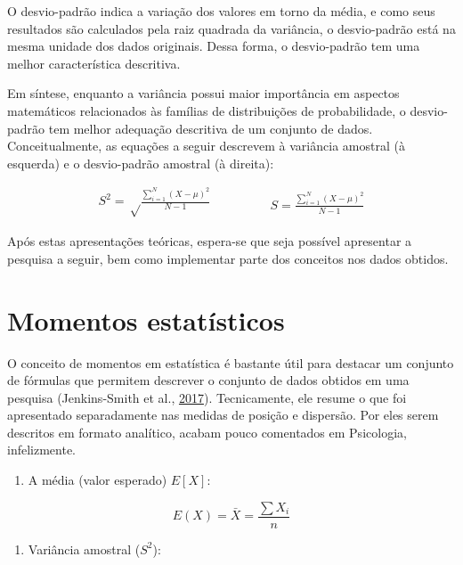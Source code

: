 \documentclass[
]{book}
\providecommand{\tightlist}{%
  \setlength{\itemsep}{0pt}\setlength{\parskip}{0pt}}
\begin{document}
O desvio-padrão indica a variação dos valores em torno da média, e como
seus resultados são calculados pela raiz quadrada da variância, o
desvio-padrão está na mesma unidade dos dados originais. Dessa forma, o
desvio-padrão tem uma melhor característica descritiva.

Em síntese, enquanto a variância possui maior importância em aspectos
matemáticos relacionados às famílias de distribuições de probabilidade,
o desvio-padrão tem melhor adequação descritiva de um conjunto de dados.
Conceitualmente, as equações a seguir descrevem à variância amostral (à
esquerda) e o desvio-padrão amostral (à direita):

\begin{equation}
  \begin{split}
    S^2 = \sqrt\frac{\sum\limits_{i=1}^N (X -\mu)^2}{N-1}
  \end{split}
\qquad\qquad
  \begin{split}
    S = \frac{\sum\limits_{i=1}^N (X -\mu)^2}{N-1}
  \end{split}
\end{equation}

Após estas apresentações teóricas, espera-se que seja possível
apresentar a pesquisa a seguir, bem como implementar parte dos conceitos
nos dados obtidos.

\hypertarget{momentos-estatuxedsticos}{%
\section{Momentos estatísticos}\label{momentos-estatuxedsticos}}

O conceito de momentos em estatística é bastante útil para destacar um
conjunto de fórmulas que permitem descrever o conjunto de dados obtidos
em uma pesquisa (Jenkins-Smith et al.,
\protect\hyperlink{ref-JenkinsSmith2017}{2017}). Tecnicamente, ele
resume o que foi apresentado separadamente nas medidas de posição e
dispersão. Por eles serem descritos em formato analítico, acabam pouco
comentados em Psicologia, infelizmente.

\begin{enumerate}
\def\labelenumi{\arabic{enumi}.}
\tightlist
\item
  A média (valor esperado) \(E[X]\):
\end{enumerate}

\[E(X) = \bar{X}=\frac{\sum X_{i}}{n}\]

\begin{enumerate}
\def\labelenumi{\arabic{enumi}.}
\setcounter{enumi}{1}
\tightlist
\item
  Variância amostral (\(S^2\)):
\end{enumerate}
\end{document}
